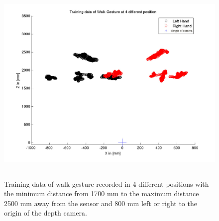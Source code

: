 \begin{figure}
	[h] \centering 
	\includegraphics[height=10cm]{figures/result/train-walk-all.jpg} \caption{Training data of walk gesture recorded in 4 different positions with the minimum distance from 1700 mm to the maximum distance 2500 mm away from the sensor and 800 mm left or right to the origin of the depth camera.} 
	\label{fg:ges:pos} 
\end{figure}
